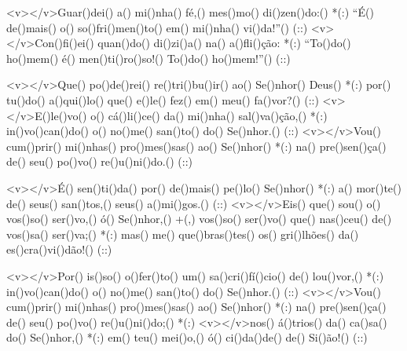<v></v>Guar()dei() a() mi()nha() fé,() mes()mo() di()zen()do:() *(:)
``É() de()mais() o() so()fri()men()to() em() mi()nha() vi()da!''() (::)
<v></v>Con()fi()ei() quan()do() di()zi()a() na() a()fli()ção: *(:)
``To()do() ho()mem() é() men()ti()ro()so!() To()do() ho()mem!''() (::)

<v></v>Que() po()de()rei() re()tri()bu()ir() ao() Se()nhor() Deus() *(:)
por() tu()do() a()qui()lo() que() e()le() fez() em() meu() fa()vor?() (::)
<v></v>E()le()vo() o() cá()li()ce() da() mi()nha() sal()va()ção,() *(:)
in()vo()can()do() o() no()me() san()to() do() Se()nhor.() (::)
<v></v>Vou() cum()prir() mi()nhas() pro()mes()sas() ao() Se()nhor() *(:)
na() pre()sen()ça() de() seu() po()vo() re()u()ni()do.() (::)

<v></v>É() sen()ti()da() por() de()mais() pe()lo() Se()nhor() *(:)
a() mor()te() de() seus() san()tos,() seus() a()mi()gos.() (::)
<v></v>Eis() que() sou() o() vos()so() ser()vo,() ó() Se()nhor,() +(,)
vos()so() ser()vo() que() nas()ceu() de() vos()sa() ser()va;() *(:)
mas() me() que()bras()tes() os() gri()lhões() da() es()cra()vi()dão!() (::)

<v></v>Por() is()so() o()fer()to() um() sa()cri()fí()cio() de() lou()vor,() *(:)
in()vo()can()do() o() no()me() san()to() do() Se()nhor.() (::)
<v></v>Vou() cum()prir() mi()nhas() pro()mes()sas() ao() Se()nhor() *(:)
na() pre()sen()ça() de() seu() po()vo() re()u()ni()do;() *(:)
<v></v>nos() á()trios() da() ca()sa() do() Se()nhor,() *(:)
em() teu() mei()o,() ó() ci()da()de() de() Si()ão!() (::)